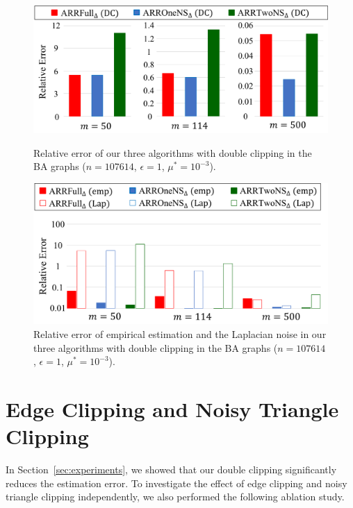 {\begin{figure}[t]
  \centering
  \includegraphics[width=0.99\linewidth]{fig/resA_BAGraph.pdf}
  \vspace{-4mm}
  \caption{Relative error of our three algorithms with double clipping in the BA graphs ($n=107614$, $\epsilon=1$, $\mu^* = 10^{-3}$).}
  \label{fig:resA_BAGraph}
\vspace{5mm}
  \centering
  \includegraphics[width=0.95\linewidth]{fig/resA_BAGraph_emp_Lap.pdf}
  \vspace{-4mm}
  \caption{Relative error of empirical estimation and the Laplacian noise in our three algorithms with double clipping in the BA graphs ($n=107614$, $\epsilon=1$, $\mu^* = 10^{-3}$).}
  \label{fig:resA_BAGraph_emp_Lap}
\end{figure}

\section{Edge Clipping and Noisy Triangle Clipping}
\label{sec:EC_DC}
In Section~\ref{sec:experiments}, we showed that our double clipping significantly reduces the estimation error.
To investigate the effect of
edge clipping and noisy triangle clipping independently, we also performed the following ablation study.

}

